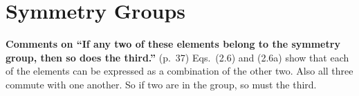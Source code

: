 \chapter{Symmetry Groups}

{\bf Comments on ``If any two of these elements belong to the symmetry
  group, then so does the third.''} (p.\ 37) Eqs.\ (2.6) and (2.6a)
show that each of the elements can be expressed as a combination of
the other two. Also all three commute with one another. So if two are
in the group, so must the third.
